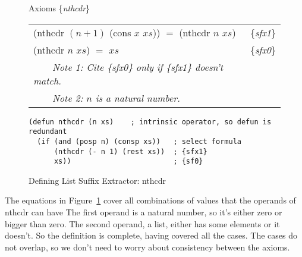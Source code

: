 \begin{figure}
\begin{center}
Axioms \{\emph{nthcdr}\} \\
\begin{tabular}{ll}
\textsf{(nthcdr $(n+1)$ (cons $x$ $xs$))} $=$ \textsf{(nthcdr $n$ $xs$)} & \{\emph{sfx1}\} \\
\textsf{(nthcdr $n$ $xs$)} $=$ $xs$                            & \{\emph{sfx0}\}   \\
~~~~\emph{Note 1: Cite \{\emph{sfx0}\} only if \{\emph{sfx1}\} doesn't match.}&\\
~~~~\emph{Note 2: $n$ is a natural number.}
\end{tabular}
\begin{Verbatim}
(defun nthcdr (n xs)    ; intrinsic operator, so defun is redundant
  (if (and (posp n) (consp xs))   ; select formula
      (nthcdr (- n 1) (rest xs))  ; {sfx1}
      xs))                        ; {sf0}
\end{Verbatim}
\end{center}
\caption{Defining List Suffix Extractor: nthcdr}
\label{fig:nthcdr-defun}
\end{figure}


The equations in Figure~\ref{fig:nthcdr-defun} cover all combinations
of values that the operands of \textsf{nthcdr} can have
The first operand is a natural number,
so it's either zero or bigger than zero.
The second operand, a list, either has some elements or it doesn't.
So the definition is complete, having covered all the cases.
The cases do not overlap, so we don't need to worry about
consistency between the axioms.

